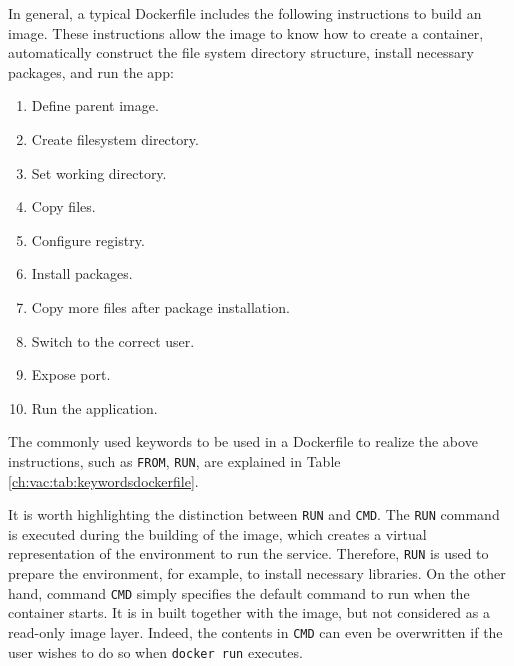 In general, a typical Dockerfile includes the following instructions to build an image. These instructions allow the image to know how to create a container, automatically construct the file system directory structure, install necessary packages, and run the app:
\begin{enumerate}[(1)]
  \item Define parent image.
  \item Create filesystem directory.
  \item Set working directory.
  \item Copy files.
  \item Configure registry.
  \item Install packages.
  \item Copy more files after package installation.
  \item Switch to the correct user.
  \item Expose port.
  \item Run the application.
\end{enumerate}

The commonly used keywords to be used in a Dockerfile to realize the above instructions, such as \verb|FROM|, \verb|RUN|, are explained in Table \ref{ch:vac:tab:keywordsdockerfile}. 

It is worth highlighting the distinction between \verb|RUN| and \verb|CMD|. The \verb|RUN| command is executed during the building of the image, which creates a virtual representation of the environment to run the service. Therefore, \verb|RUN| is used to prepare the environment, for example, to install necessary libraries. On the other hand, command \verb|CMD| simply specifies the default command to run when the container starts. It is in built together with the image, but not considered as a read-only image layer. Indeed, the contents in \verb|CMD| can even be overwritten if the user wishes to do so when \verb|docker run| executes.

